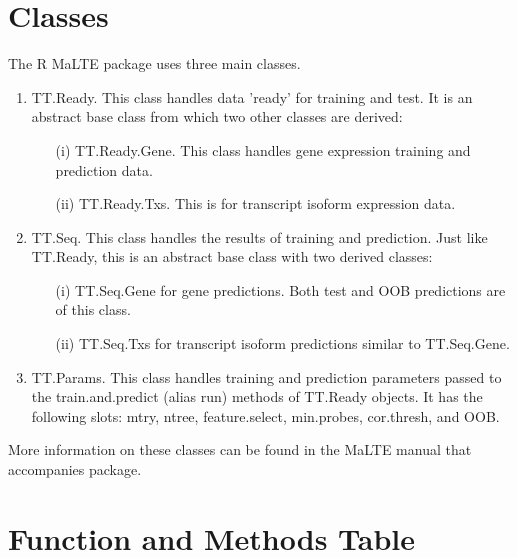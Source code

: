 \documentclass[a4paper,12pt]{article}
\begin{document}
\pagebreak
\appendix
\section{Classes}
The R MaLTE package uses three main classes.
\begin{enumerate}
\item TT.Ready. This class handles data 'ready' for training and test. It is an abstract base class from which two other classes are derived:
\begin{enumerate}
\item[(i)] TT.Ready.Gene. This class handles gene expression training and prediction data.
\item[(ii)] TT.Ready.Txs. This is for transcript isoform expression data.
\end{enumerate}

\item TT.Seq. This class handles the results of training and prediction. Just like TT.Ready, this is an abstract base class with two derived classes:
\begin{enumerate}
\item[(i)] TT.Seq.Gene for gene predictions. Both test and OOB predictions are of this class.
\item[(ii)] TT.Seq.Txs for transcript isoform predictions similar to TT.Seq.Gene.
\end{enumerate}

\item TT.Params. This class handles training and prediction parameters passed to the train.and.predict (alias run) methods of TT.Ready objects. It has the following slots: mtry, ntree, feature.select, min.probes, cor.thresh, and OOB.
\end{enumerate}

More information on these classes can be found in the MaLTE manual that accompanies package.

\section{Function and Methods Table}
\end{document}

